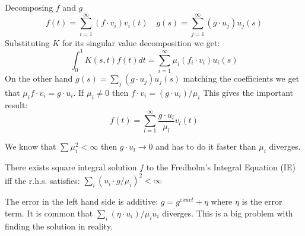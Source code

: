 Decomposing $f$ and $g$ $$f(t)= \sum_{i=1}^\infty (f\cdot v_i) v_i(t) \quad g(s) =\sum_{j=1}^\infty (g\cdot u_j )u_j(s)$$
Substituting $K$ for its singular value decomposition we get: 
    $$\int_0^1 K(s,t) f(t)dt = \sum_{i=1}^\infty \mu_i (f_i\cdot v_i) u_i(s)$$
On the other hand $g(s) = \sum_j (g\cdot u_j)u_j(s)$ matching the coefficients we get that $\mu_i f\cdot v_i = g\cdot u_i$. If $\mu_i\neq 0$ then $ f\cdot v_i = (g\cdot u_i)/\mu_i$ This gives the important result: 
    $$ f(t) = \sum_{l=1}^\infty \frac{g\cdot u_l}{\mu_l} v_l(t)$$ 

\begin{remarks}
We know that $\sum\mu_i^2 < \infty$ then $g\cdot u_l \to 0$ and has to do it faster than $\mu_i$ diverges.
\end{remarks}

\begin{teorema}
There exists square integral solution $f$ to the Fredholm's Integral Equation (IE) iff the r.h.s. satisfies: $\sum_i (u_i\cdot g /\mu_i)^2 < \infty$
\end{teorema}

The error in the left hand side is additive: $g=g^{exact}+\eta$ where $\eta$ is the error term. It is common that $\sum_i (\eta\cdot u_i)/\mu_i u_i$ diverges. This is a big problem with finding the solution in reality.
